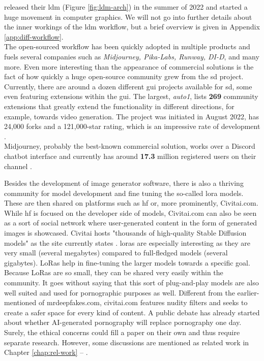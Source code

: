\documentclass[
  a4paper,  %
  twoside,  %
  bibliography=totoc,
  headsepline,
  cleardoublepage=empty,
  parskip=half,
  draft=false
]{scrbook}
\begin{document}
\citet{rombachHighResolutionImageSynthesis2022} released their \gls{ldm} (Figure \ref{fig:ldm-arch}) in the summer of 2022 and started a huge movement in computer graphics. We will not go into further details about the inner workings of the \gls{ldm} workflow, but a brief overview is given in Appendix \ref{app:diff-workflow}.\\
The open-sourced workflow has been quickly adopted in multiple products and fuels several companies such as \textit{Midjourney, Pika-Labs, Runway, DI-D}, and many more. Even more interesting than the appearance of commercial solutions is the fact of how quickly a huge open-source community grew from the \gls{sd} project. Currently, there are around a dozen different \gls{gui} projects available for \gls{sd}, some even featuring extensions within the \gls{gui}. The largest, \textit{\gls{auto1}}, lists \textbf{269} community extensions that greatly extend the functionality in different directions, for example, towards video generation. The project was initiated in August 2022, has 24,000 forks and a 121,000-star rating, which is an impressive rate of development \cite{AUTOMATIC1111StablediffusionwebuiStable}. \\
Midjourney, probably the best-known commercial solution, works over a Discord chatbot interface and currently has around \textbf{17.3} million registered users on their channel \cite{midjourneyJoinMidjourneyDiscord}.

Besides the development of image generator software, there is also a thriving community for model development and fine tuning the so-called \gls{lora} models. These are then shared on platforms such as \gls{hf} or, more prominently, Civitai.com. While \gls{hf} is focused on the developer side of models, Civitai.com can also be seen as a sort of social network where user-generated content in the form of generated images is showcased. Civitai hosts "thousands of high-quality Stable Diffusion models" as the site currently states \cite{CivitaiHomeOpenSource}. \gls{lora}s are especially interesting as they are very small (several megabytes) compared to full-fledged models (several gigabytes). LoRas help in fine-tuning the larger models towards a specific goal. Because LoRas are so small, they can be shared very easily within the community. It goes without saying that this sort of plug-and-play models are also well suited and used for pornographic purposes as well. Different from the earlier-mentioned of mrdeepfakes.com, civitai.com features nudity filters and seeks to create a safer space for every kind of content. A public debate has already started about whether AI-generated pornography will replace pornography one day. Surely, the ethical concerns could fill a paper on their own and thus require separate research. However, some discussions are mentioned as related work in Chapter \ref{chap:rel-work} – .
\end{document}
